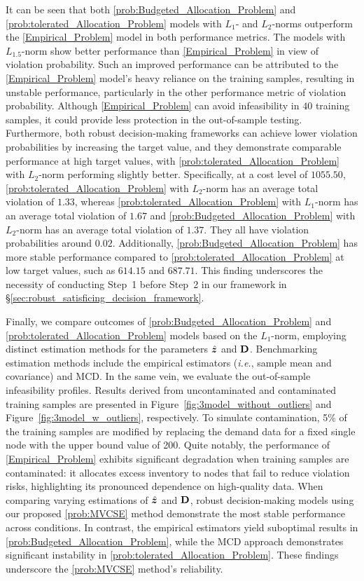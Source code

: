 \documentclass[mnsc, nonblindrev]{informswp}
\newcommand{\1}[1]{\mathds{1}{\left(#1\right)}}
\begin{document}
It can be seen that both \ref{prob:Budgeted_Allocation_Problem} and \ref{prob:tolerated_Allocation_Problem} models with $L_1$- and $L_2$-norms outperform the \ref{Empirical_Problem} model in both performance metrics. The models with $L_{1.5}$-norm show better performance than \ref{Empirical_Problem} in view of violation probability. Such an improved performance can be attributed to the \ref{Empirical_Problem} model's heavy reliance on the training samples, resulting in unstable performance, particularly in the other performance metric of violation probability. Although \ref{Empirical_Problem} can avoid infeasibility in $40$ training samples, it could provide less protection in the out-of-sample testing. Furthermore, both robust decision-making frameworks can achieve lower violation probabilities by increasing the target value, and they demonstrate comparable performance at high target values, with \ref{prob:tolerated_Allocation_Problem} with $L_2$-norm performing slightly better. Specifically, at a cost level of $1055.50$,
\ref{prob:tolerated_Allocation_Problem} with $L_2$-norm has an average total violation of $1.33$, whereas \ref{prob:tolerated_Allocation_Problem} with $L_1$-norm has an average total violation of $1.67$ and \ref{prob:Budgeted_Allocation_Problem} with $L_2$-norm has an average total violation of $1.37$. They all have violation probabilities around $0.02$.
Additionally, \ref{prob:Budgeted_Allocation_Problem} has more stable performance compared to \ref{prob:tolerated_Allocation_Problem} at low target values, such as $614.15$ and $687.71$. This finding underscores the necessity of conducting Step~1 before Step~2 in our framework in \S \ref{sec:robust_satisficing_decision_framework}.

Finally, we compare outcomes of \ref{prob:Budgeted_Allocation_Problem} and \ref{prob:tolerated_Allocation_Problem} models based on the  $L_1$-norm, employing distinct estimation methods for the parameters $\hat{\bm{z}}$ and ${\mathbf{D}}$. Benchmarking estimation methods include the empirical estimators (\textit{i.e.}, sample mean and covariance) and MCD.
In the same vein, we evaluate the out-of-sample infeasibility profiles. Results derived from uncontaminated and contaminated training samples are presented in Figure~\ref{fig:3model_without_outliers} and Figure~\ref{fig:3model_w_outliers}, respectively. To simulate contamination, 5\% of the training samples are modified by replacing the demand data for a fixed single node with the upper bound value of 200. Quite notably, the performance of \ref{Empirical_Problem} exhibits significant degradation when training samples are contaminated: it allocates excess inventory to nodes that fail to reduce violation risks, highlighting its pronounced dependence on high-quality data. When comparing varying estimations of $\hat{\bm{z}}$ and ${\mathbf{D}}$, robust decision-making models using our proposed \ref{prob:MVCSE} method demonstrate the most stable performance across conditions. In contrast, the empirical estimators yield suboptimal results in \ref{prob:Budgeted_Allocation_Problem}, while the MCD approach demonstrates significant instability in \ref{prob:tolerated_Allocation_Problem}. These findings underscore the \ref{prob:MVCSE} method's reliability.
\end{document}
